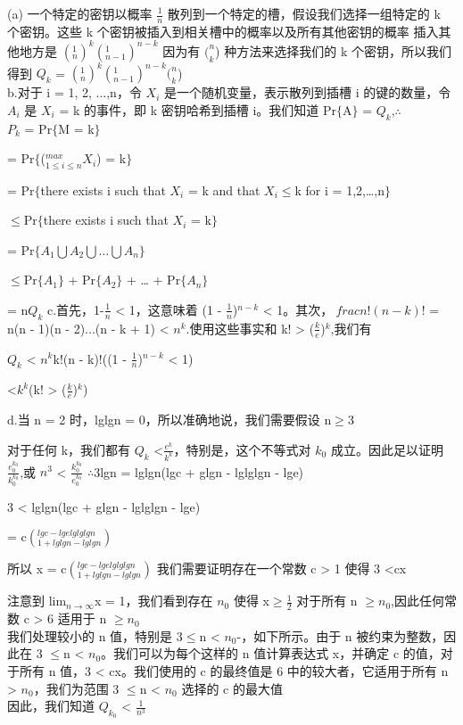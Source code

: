 \documentclass[a4paper, justified]{tufte-handout}
\begin{document}
\begin{solution}
  (a) 一个特定的密钥以概率 $\frac{1}{n}$ 散列到一个特定的槽，假设我们选择一组特定的 k 个密钥。这些 k 个密钥被插入到相关槽中的概率以及所有其他密钥的概率 插入其他地方是 $(^1_n)^k$$(^1_{n - 1})^{n - k}$
        因为有 $(^n_k$) 种方法来选择我们的 k 个密钥，所以我们得到
      $Q_k$ = $(^1_n)^k$$(^1_{n - 1})^{n - k}$$(^n_k$)\\
        b.对于 i = 1, 2, ...,n，令 $X_i$ 是一个随机变量，表示散列到插槽 i 的键的数量，令 $A_i$ 是 $X_i$ = k 的事件，即 k 密钥哈希到插槽 i。我们知道 Pr$\{$A$\}$ = $Q_k$,$\therefore$\\
      $P_k$ = Pr$\{$M = k$\}$

        = Pr$\{$($_{1\le i\le n}^{max}X_i$) = k$\}$

        = Pr$\{$there exists i such that $X_i$ = k and that $X_i$$\le$k for i = 1,2,…,n$\}$

  $\le$Pr$\{$there exists i such that $X_i$ = k$\}$

      = Pr$\{$$A_1\bigcup A_2\bigcup …\bigcup A_n$$\}$

  $\le$Pr$\{$$A_1$$\}$ + Pr$\{$$A_2$$\}$ + … + Pr$\{$$A_n$$\}$

      = n$Q_k$
      c.首先，1-$\frac{1}{n}$ < 1，这意味着 (1 - $\frac{1}{n}$)$^{n - k}$ < 1。其次，$\ frac{n!}{(n - k)!}$ = n(n - 1)(n - 2)...(n - k + 1) < $n^k$.使用这些事实和 k! > ($\frac{k}{e}$)$^k$,我们有

    $Q_k$ < $n^k$k!(n - k)!((1 - $\frac{1}{n}$)$^{n - k}$ < 1)

      <$k^k$(k! > ($\frac{k}{e}$)$^k$)

      d.当 n = 2 时，lglgn = 0，所以准确地说，我们需要假设 n$\ge$3

      对于任何 k，我们都有 $Q_k$ <$\frac{e^k}{k^k}$，特别是，这个不等式对 $k_0$ 成立。因此足以证明 $\frac{e_0^{k_0 }}{k_0^{k_0}}$,或 $n^3$ < $\frac{k_0^{k_0}}{e_0^{k_0}}$
  $\therefore$3lgn = lglgn(lgc + glgn - lglglgn - lge)

      3 < lglgn(lgc + glgn - lglglgn - lge)

      = c$(_{1 + lglgn - lglgn}^{lgc - lge lglglgn})$

      所以 x = c$(_{1 + lglgn - lglgn}^{lgc - lge lglglgn})$
      我们需要证明存在一个常数 c > 1 使得 3 <cx

      注意到 lim$_{n\to ∞}$x = 1，我们看到存在 $n_0$ 使得 x$\ge$$\frac{1}{2}$ 对于所有 n $\ge$$n_0 $,因此任何常数 c > 6 适用于 n $\ge$$n_0$\\
        我们处理较小的 n 值，特别是 3$\le$n < $n_0$-，如下所示。由于 n 被约束为整数，因此在 3 $\le$n < $n_0$。我们可以为每个这样的 n 值计算表达式 x，并确定 c 的值，对于所有 n 值，3 < cx。我们使用的 c 的最终值是 6 中的较大者，它适用于所有 n > $n_0$，我们为范围 3 $\le$n < $n_0$ 选择的 c 的最大值\\
        因此，我们知道 $Q_{k_0}$ < $\frac{1}{n^3}$


\end{solution}
\end{document}

